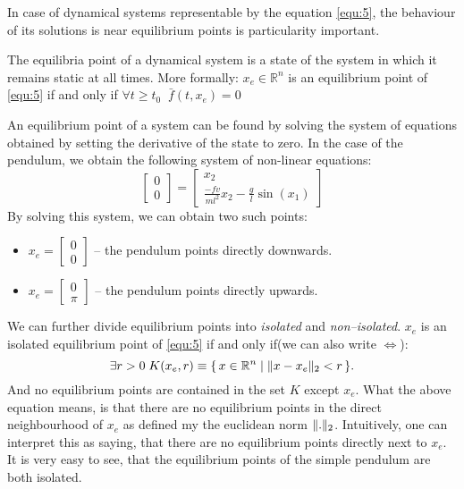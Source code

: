 In case of dynamical systems representable by the equation \ref{equ:5}, the behaviour of its solutions is near equilibrium points is particularity important.
{
    The equilibria point of a dynamical system is a state of the system in which it remains static at all times. 
    More formally: $x_e \in \mathbb{R}^{n}$ is an equilibrium point of \ref{equ:5} if and only if $\forall t \ge t_0  \;\; \bar{f}(t,x_e) = 0$ 
    {
        An equilibrium point of a system can be found by solving the system of equations obtained by setting the derivative of the state to zero. In the case of the pendulum, we obtain the following system of non-linear equations:
\begin{equation}
    \label{pendeq}
    \begin{bmatrix}
        0 \\
        0
    \end{bmatrix}
    =
    \begin{bmatrix}
        x_2 \\
        \frac{-fv}{ml^2}x_2 - \frac{g}{l}\sin(x_1)
    \end{bmatrix}
\end{equation}
By solving this system, we can obtain two such points:
\begin{itemize}
        \item $x_e = \begin{bmatrix}
            0  \\
            0
        \end{bmatrix}$ -- the pendulum points directly downwards.

    \item $x_e = \begin{bmatrix}
            0 \\
            \pi
    \end{bmatrix}$ -- the pendulum points directly upwards.
\end{itemize}
}

    
}
We can further divide equilibrium points into \textit{isolated} and \textit{non--isolated}.
{
    $x_e$ is an isolated equilibrium point of \ref{equ:5} if and only if(we can also write $\iff$): 
   \[
       \exists r > 0 \; K(x_e,r) \equiv \{\,x \in \mathbb{R}^{n} \mid \lVert x - x_e\rVert_2 < r\,\}    
   .\]  
   And no equilibrium points are contained in the set $K$ except  $x_e$.
   What the above equation means, is that there are no equilibrium points in the direct neighbourhood of $x_e$ as defined my the euclidean norm  $\lVert.\rVert_2$. Intuitively, one can interpret this as saying, that there are no equilibrium points directly next to $x_e$.
   {
       It is very easy to see, that the equilibrium points of the simple pendulum are both isolated.
   }
}
